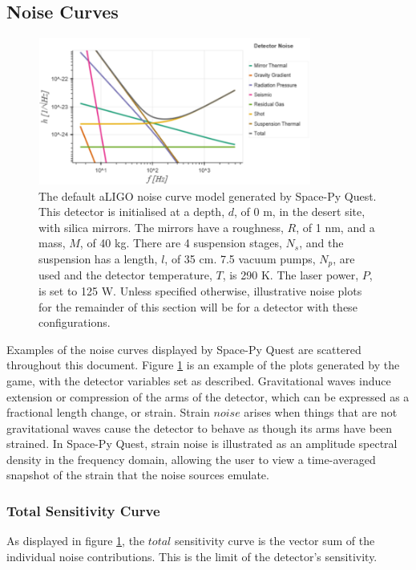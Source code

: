\documentclass{article}
\begin{document}
\subsection{Noise Curves}
\begin{figure}
\centering
\includegraphics[width=0.8\textwidth]{SPQ_aLIGO.pdf}
\caption{The default aLIGO noise curve model generated by Space-Py Quest. This detector is initialised at a depth, $d$, of 0 m, in the desert site, with silica mirrors. The mirrors have a roughness, $R$, of 1 nm, and a mass, $M$, of 40 kg. There are 4 suspension stages, $N_s$, and the suspension has a length, $l$, of 35 cm. 7.5 vacuum pumps, $N_p$, are used and the detector temperature, $T$, is 290 K. The laser power, $P$, is set to 125 W. Unless specified otherwise, illustrative noise plots for the remainder of this section will be for a detector with these configurations.}
\label{fig:aLIGO}
\end{figure}
Examples of the noise curves displayed by Space-Py Quest are scattered throughout this document. Figure \ref{fig:aLIGO} is an example of the plots generated by the game, with the detector variables set as described. Gravitational waves induce extension or compression of the arms of the detector, which can be expressed as a fractional length change, or strain. Strain $noise$ arises when things that are not gravitational waves cause the detector to behave as though its arms have been strained. In Space-Py Quest, strain noise is illustrated as an amplitude spectral density in the frequency domain, allowing the user to view a time-averaged snapshot of the strain that the noise sources emulate.
\subsubsection{Total Sensitivity Curve}
As displayed in figure \ref{fig:aLIGO}, the $total$ sensitivity curve is the vector sum of the individual noise contributions. This is the limit of the detector's sensitivity.
\end{document}
